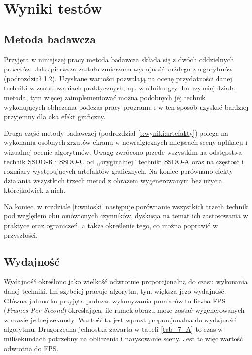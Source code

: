 \chapter{Wyniki testów}
\label{t:wyniki}

	\section{Metoda badawcza}
	\label{t:wyniki:metoda}
	
	
	Przyjęta w niniejszej pracy metoda badawcza składa się z dwóch oddzielnych procesów. Jako pierwsza została zmierzona wydajność każdego z algorytmów (podrozdział \ref{t:wyniki:wydajnosc}). Uzyskane wartości pozwalają na ocenę przydatności danej techniki w zastosowaniach praktycznych, np. w silniku gry. Im szybciej działa metoda, tym więcej zaimplementować można podobnych jej technik wykonujących obliczenia podczas pracy programu i w ten sposób uzyskać bardziej przyjemny dla oka efekt graficzny.
	
	Druga część metody badawczej (podrozdział \ref{t:wyniki:artefakty}) polega na wykonaniu osobnych zrzutów ekranu w newralgicznych miejscach sceny aplikacji i wizualnej ocenie algorytmów. Uwagę zwrócono przede wszystkim na odstępstwa technik SSDO-B i SSDO-C od ,,oryginalnej'' techniki SSDO-A oraz na częstość i rozmiary występujących artefaktów graficznych. Na koniec porównano efekty działania wszystkich trzech metod z obrazem wygenerowanym bez użycia którejkolwiek z nich.
	
	Na koniec, w rozdziale \ref{t:wnioski} następuje porównanie wszystkich trzech technik pod względem obu omówionych czynników, dyskusja na temat ich zastosowania w praktyce oraz ograniczeń, a także określenie tego, co można poprawić w przyszłości.
	
	\section{Wydajność}
	\label{t:wyniki:wydajnosc}
	
	
	
	
	Wydajność określono jako wielkość odwrotnie proporcjonalną do czasu wykonania danej techniki. Im szybciej pracuje algorytm, tym większa jego wydajność. Główna jednostka przyjęta podczas wykonywania pomiarów to liczba FPS (\emph{Frames Per Second}) określająca, ile ramek obrazu może zostać wygenerowanych w czasie jednej sekundy. Wartość ta jest wprost proporcjonalna do wydajności algorytmu. Drugorzędna jednostka zawarta w tabeli \ref{tab_7_A} to czas w milisekundach potrzebny na obliczenia i narysowanie sceny. Jest to więc wartość odwrotna do FPS.
	
